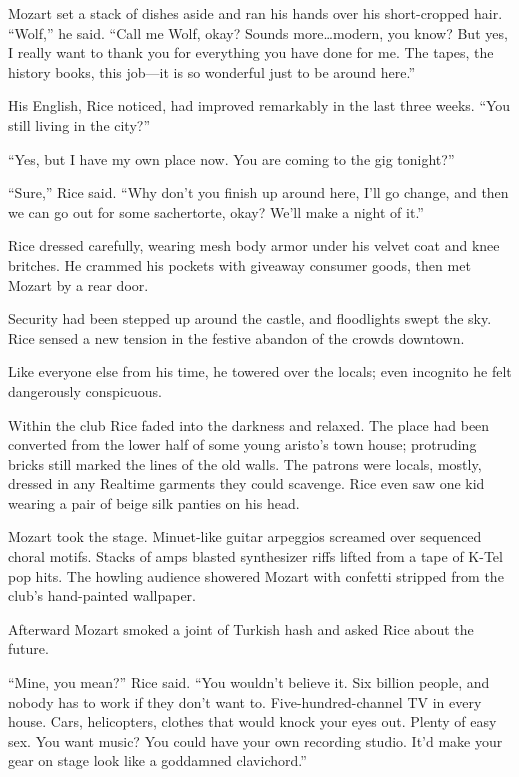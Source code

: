 Mozart set a stack of dishes aside and ran his hands over his short-cropped hair. ``Wolf,'' he said. ``Call me Wolf, okay? Sounds more\ldots modern, you know? But yes, I really want to thank you for everything you have done for me. The tapes, the history books, this job—it is so wonderful just to be around here.''

His English, Rice noticed, had improved remarkably in the last three weeks. ``You still living in the city?''

``Yes, but I have my own place now. You are coming to the gig tonight?''

``Sure,'' Rice said. ``Why don't you finish up around here, I'll go change, and then we can go out for some sachertorte, okay? We'll make a night of it.''

Rice dressed carefully, wearing mesh body armor under his velvet coat and knee britches. He crammed his pockets with giveaway consumer goods, then met Mozart by a rear door.

Security had been stepped up around the castle, and floodlights swept the sky. Rice sensed a new tension in the festive abandon of the crowds downtown.

Like everyone else from his time, he towered over the locals; even incognito he felt dangerously conspicuous.

Within the club Rice faded into the darkness and relaxed. The place had been converted from the lower half of some young aristo's town house; protruding bricks still marked the lines of the old walls. The patrons were locals, mostly, dressed in any Realtime garments they could scavenge. Rice even saw one kid wearing a pair of beige silk panties on his head.

Mozart took the stage. Minuet-like guitar arpeggios screamed over sequenced choral motifs. Stacks of amps blasted synthesizer riffs lifted from a tape of K-Tel pop hits. The howling audience showered Mozart with confetti stripped from the club's hand-painted wallpaper.

Afterward Mozart smoked a joint of Turkish hash and asked Rice about the future.

``Mine, you mean?'' Rice said. ``You wouldn't believe it. Six billion people, and nobody has to work if they don't want to. Five-hundred-channel TV in every house. Cars, helicopters, clothes that would knock your eyes out. Plenty of easy sex. You want music? You could have your own recording studio. It'd make your gear on stage look like a goddamned clavichord.''

